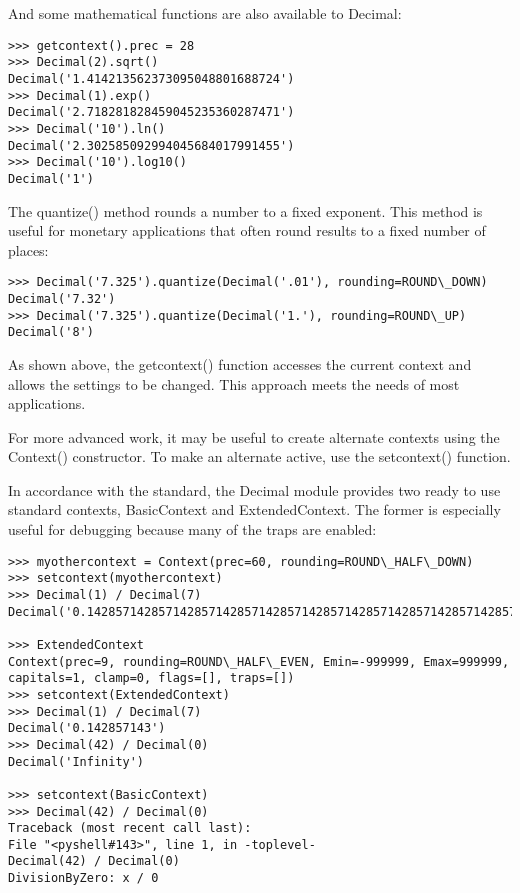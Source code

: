 And some mathematical functions are also available to Decimal:

\begin{lstlisting}
>>> getcontext().prec = 28
>>> Decimal(2).sqrt()
Decimal('1.414213562373095048801688724')
>>> Decimal(1).exp()
Decimal('2.718281828459045235360287471')
>>> Decimal('10').ln()
Decimal('2.302585092994045684017991455')
>>> Decimal('10').log10()
Decimal('1')
\end{lstlisting}

The quantize() method rounds a number to a fixed exponent. This method is useful for monetary applications that often round results to a fixed number of places:

\begin{lstlisting}
>>> Decimal('7.325').quantize(Decimal('.01'), rounding=ROUND\_DOWN)
Decimal('7.32')
>>> Decimal('7.325').quantize(Decimal('1.'), rounding=ROUND\_UP)
Decimal('8')
\end{lstlisting}

As shown above, the getcontext() function accesses the current context and allows the settings to be changed. This approach meets the needs of most applications.

For more advanced work, it may be useful to create alternate contexts using the Context() constructor. To make an alternate active, use the setcontext() function.

In accordance with the standard, the Decimal module provides two ready to use standard contexts, BasicContext and ExtendedContext. The former is especially useful for debugging because many of the traps are enabled:

\begin{lstlisting}
>>> myothercontext = Context(prec=60, rounding=ROUND\_HALF\_DOWN)
>>> setcontext(myothercontext)
>>> Decimal(1) / Decimal(7)
Decimal('0.142857142857142857142857142857142857142857142857142857142857')

>>> ExtendedContext
Context(prec=9, rounding=ROUND\_HALF\_EVEN, Emin=-999999, Emax=999999,
capitals=1, clamp=0, flags=[], traps=[])
>>> setcontext(ExtendedContext)
>>> Decimal(1) / Decimal(7)
Decimal('0.142857143')
>>> Decimal(42) / Decimal(0)
Decimal('Infinity')

>>> setcontext(BasicContext)
>>> Decimal(42) / Decimal(0)
Traceback (most recent call last):
File "<pyshell#143>", line 1, in -toplevel-
Decimal(42) / Decimal(0)
DivisionByZero: x / 0
\end{lstlisting}

